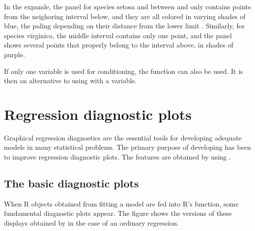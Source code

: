 \documentclass[11pt]{article}\usepackage[]{graphicx}\usepackage[]{color}
\begin{document}
In the expamle, the panel for species setosa and  between
 and  only contains points from the neighoring interval
below, and they are all colored in varying shades of blue, the paling
depending on their distance from the lower limit .
Similarly, for species virginica, the middle interval contains only one 
point, and the panel shows several points that properly belong to the
interval above, in shades of purple.

If only one variable is used for conditioning, the function can also 
be used. It is then an alternative to using  with 
a  variable.

\section{Regression diagnostic plots}
Graphical regression diagnostics are the essential tools for developing
adequate models in many statistical problems.
The primary purpose of developing  has been to improve
regression diagnostic plots.
The features are obtained by using .

\subsection{The basic diagnostic plots}
When R objects obtained from fitting a model are fed into R's 
function, some fundamental diagnostic plots appear. 
The figure shows the versions of these displays obtained by 
in the case of an ordinary regression.
\end{document}

